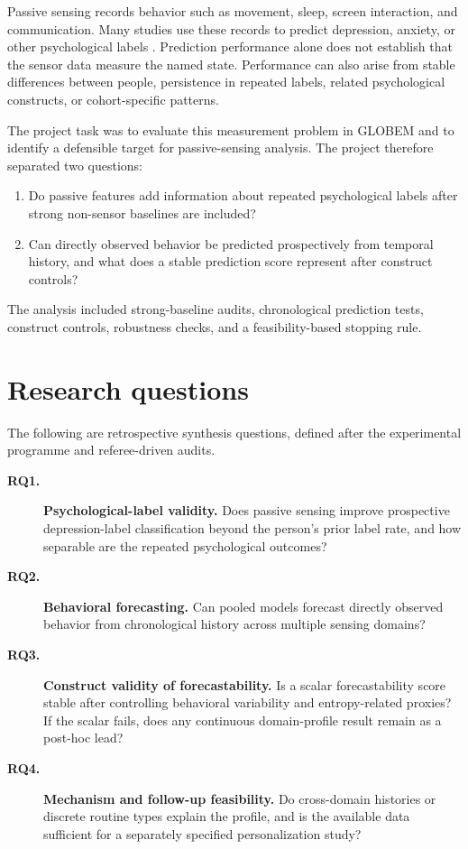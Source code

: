 \documentclass[a4paper,11pt,oneside]{report}
\begin{document}
Passive sensing records behavior such as movement, sleep, screen interaction, and
communication. Many studies use these records to predict depression, anxiety, or
other psychological labels \citep{onnela2016digital,mohr2017personal,saeb2015mobile}.
Prediction performance alone does not establish that the sensor data measure the
named state. Performance can also arise from stable differences between people,
persistence in repeated labels, related psychological constructs, or cohort-specific
patterns.

The project task was to evaluate this measurement problem in GLOBEM and to identify
a defensible target for passive-sensing analysis. The project therefore separated
two questions:

\begin{enumerate}
  \item Do passive features add information about repeated psychological labels
  after strong non-sensor baselines are included?
  \item Can directly observed behavior be predicted prospectively from temporal
  history, and what does a stable prediction score represent after construct
  controls?
\end{enumerate}

The analysis included strong-baseline audits, chronological prediction tests,
construct controls, robustness checks, and a feasibility-based stopping rule.

\section{Research questions}

The following are retrospective synthesis questions, defined after the experimental
programme and referee-driven audits.

\begin{description}
  \item[\textbf{RQ1.}] \textbf{Psychological-label validity.} Does passive sensing improve
  prospective depression-label classification beyond the person's prior label rate,
  and how separable are the repeated psychological outcomes?

  \item[\textbf{RQ2.}] \textbf{Behavioral forecasting.} Can pooled models forecast directly observed
  behavior from chronological history across multiple sensing domains?

  \item[\textbf{RQ3.}] \textbf{Construct validity of forecastability.} Is a scalar forecastability
  score stable after controlling behavioral variability and entropy-related proxies?
  If the scalar fails, does any continuous domain-profile result remain as a
  post-hoc lead?

  \item[\textbf{RQ4.}] \textbf{Mechanism and follow-up feasibility.} Do cross-domain histories or
  discrete routine types explain the profile, and is the available data sufficient
  for a separately specified personalization study?
\end{description}
\end{document}
